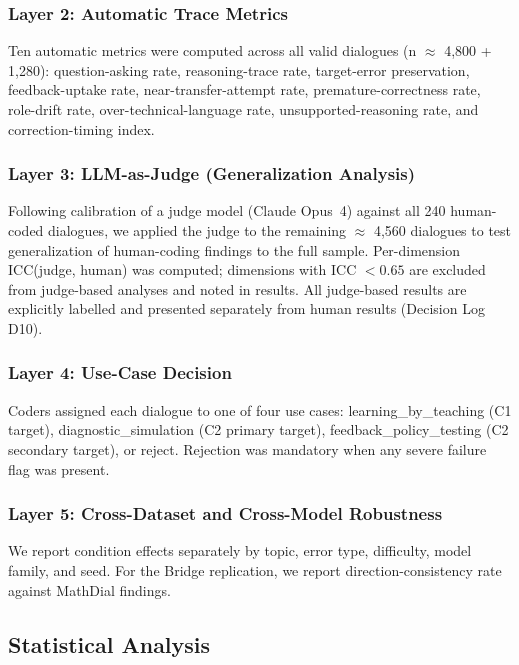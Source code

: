 \documentclass[12pt]{article}
\begin{document}
\subsubsection{Layer 2: Automatic Trace Metrics}

Ten automatic metrics were computed across all valid dialogues (n $\approx$ 4,800 + 1,280):
question-asking rate, reasoning-trace rate, target-error preservation, feedback-uptake rate,
near-transfer-attempt rate, premature-correctness rate, role-drift rate, over-technical-language
rate, unsupported-reasoning rate, and correction-timing index.

\subsubsection{Layer 3: LLM-as-Judge (Generalization Analysis)}

Following calibration of a judge model (Claude Opus~4) against all 240 human-coded dialogues,
we applied the judge to the remaining $\approx$ 4,560 dialogues to test generalization of
human-coding findings to the full sample. Per-dimension ICC(judge, human) was computed;
dimensions with ICC $< 0.65$ are excluded from judge-based analyses and noted in results.
All judge-based results are explicitly labelled and presented separately from human results
(Decision Log D10).

\subsubsection{Layer 4: Use-Case Decision}

Coders assigned each dialogue to one of four use cases: learning\_by\_teaching (C1 target),
diagnostic\_simulation (C2 primary target), feedback\_policy\_testing (C2 secondary target),
or reject. Rejection was mandatory when any severe failure flag was present.

\subsubsection{Layer 5: Cross-Dataset and Cross-Model Robustness}

We report condition effects separately by topic, error type, difficulty, model family, and
seed. For the Bridge replication, we report direction-consistency rate against MathDial findings.

\subsection{Statistical Analysis}
\end{document}
